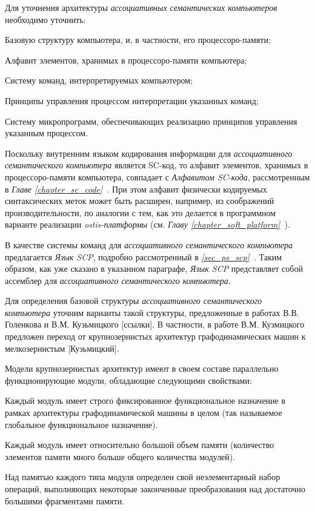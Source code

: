Для уточнения архитектуры \textit{ассоциативных семантических компьютеров} необходимо уточнить:
\begin{textitemize}
	\item Базовую структуру компьютера, и, в частности, его процессоро-памяти;
	\item Алфавит элементов, хранимых в процессоро-памяти компьютера;
	\item Систему команд, интерпретируемых компьютером;
	\item Принципы управления процессом интерпретации указанных команд;
	\item Систему микропрограмм, обеспечивающих реализацию принципов управления указанным процессом.
\end{textitemize}

Поскольку внутренним языком кодирования информации для \textit{ассоциативного семантического компьютера} является SC-код, то алфавит элементов, хранимых в процессоро-памяти компьютера, совпадает с \textit{Алфавитом SC-кода}, рассмотренным в \textit{Главе \ref{chapter_sc_code}~}. При этом алфавит физически кодируемых  синтаксических меток может быть расширен, например, из соображений производительности, по аналогии с тем, как это делается в программном варианте реализации \textit{ostis-платформы} (см. \textit{Главу \ref{chapter_soft_platform}~}).

В качестве системы команд для \textit{ассоциативного семантического компьютера} предлагается \textit{Язык SCP}, подробно рассмотренный в \textit{\ref{sec_ps_scp}~}. Таким образом, как уже сказано в указанном параграфе, \textit{Язык SCP} представляет собой ассемблер для \textit{ассоциативного семантического компьютера}.

Для определения базовой структуры \textit{ассоциативного семантического компьютера} уточним варианты такой структуры, предложенные в работах В.В. Голенкова и В.М. Кузьмицкого [ссылки]. В частности, в работе В.М. Кузмицкого предложен переход от крупнозернистых архитектур графодинамических машин к мелкозернистым [Кузьмицкий].

Модели крупнозернистых архитектур имеют в своем составе параллельно функционирующие модули, обладающие следующими свойствами: 
\begin{textitemize}
	\item Каждый модуль имеет строго фиксированное функциональное назначение в рамках архитектуры графодинамической машины в целом (так называемое глобальное функциональное назначение).
	\item Каждый модуль имеет относительно большой объем памяти (количество элементов памяти много больше общего количества модулей).
	\item Над памятью каждого типа модуля определен свой неэлементарный набор операций, выполняющих некоторые законченные преобразования над достаточно большими фрагментами памяти.
\end{textitemize}

